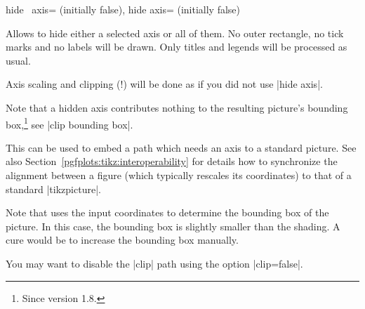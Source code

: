 \begin{pgfplotsxykeylist}{%
    hide \x\ axis= (initially false),
    hide axis= (initially false)%
}

    Allows to hide either a selected axis or all of them. No outer rectangle,
    no tick marks and no labels will be drawn. Only titles and legends will be
    processed as usual.

    Axis scaling and clipping (!) will be done as if you did not use
    |hide axis|.
\begin{codeexample}[]
\end{codeexample}

\begin{codeexample}[]
\end{codeexample}

    Note that a hidden axis contributes nothing to the resulting picture's
    bounding box,\footnote{Since version 1.8.} see
    |clip bounding box|.
\pgfplotsexpensiveexample
\begin{codeexample}[]
\end{codeexample}
    This can be used to embed a \PGFPlots{} path which needs an axis to a
    standard \tikzname{} picture. See also
    Section~\ref{pgfplots:tikz:interoperability} for details how to synchronize
    the alignment between a \PGFPlots{} figure (which typically rescales its
    coordinates) to that of a standard |tikzpicture|.

    Note that \PGFPlots{} uses the input coordinates to determine the bounding
    box of the picture. In this case, the bounding box is slightly smaller than
    the shading. A cure would be to increase the bounding box manually.

    You may want to disable the |clip| path using the option |clip=false|.
\end{pgfplotsxykeylist}



